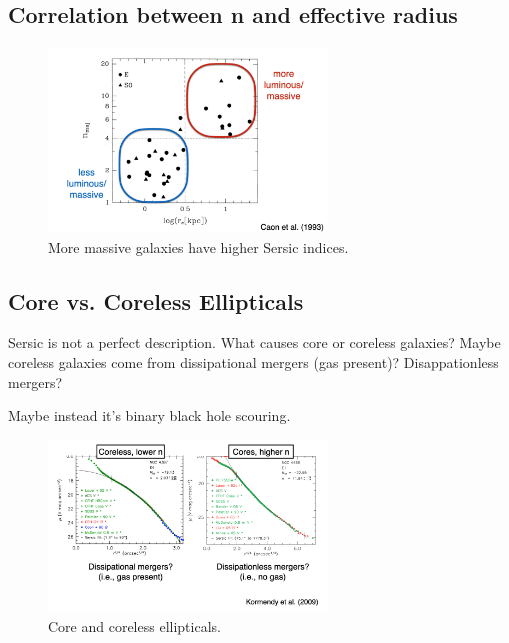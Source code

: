 \documentclass{article}
\begin{document}
\subsection{Correlation between n and effective radius}


\begin{figure}
    \centering
\includegraphics[width=0.66\textwidth]{figs/Screen Shot 2021-10-15 at 10.02.06 AM.png}
    \caption{More massive galaxies have higher Sersic indices.  }
    \label{fig:mass_sers}
\end{figure}

\subsection{Core vs. Coreless Ellipticals}

Sersic is not a perfect description.  What causes core or coreless galaxies? Maybe coreless galaxies come from dissipational mergers (gas present)? Disappationless mergers? 

Maybe instead it's binary black hole scouring. 

\begin{figure}
    \centering
\includegraphics[width=0.66\textwidth]{figs/Screen Shot 2021-10-15 at 10.03.42 AM.png}
    \caption{Core and coreless ellipticals.}
    \label{fig:cores_and_coreless_E0}
\end{figure}
\end{document}
